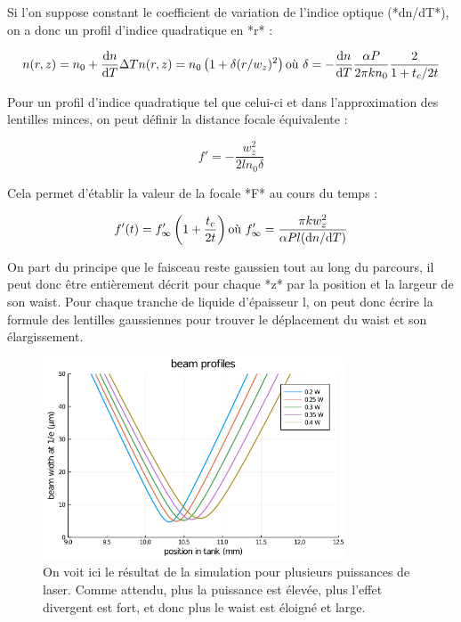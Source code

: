 Si l'on suppose constant le coefficient de variation de l'indice optique (*dn/dT*), on a donc un profil d'indice quadratique en *r* :

$$
n(r,z) = n_0 + \frac{\mathrm{d}n}{\mathrm{d}T}\Delta T
\\
n(r,z) = n_0 \left( 1+ \delta (r/w_z)^2 \right)
\\
\text{où} \ \delta = - \frac{\mathrm{d}n}{\mathrm{d}T} \frac{\alpha P}{2\pi kn_0} \frac{2}{1+t_c/2t}
$$

Pour un profil d'indice quadratique tel que celui-ci et dans l'approximation des lentilles minces, on peut définir la distance focale équivalente :

$$
f' = -\frac{w^2_z}{2ln_0\delta}
$$

Cela permet d'établir la valeur de la focale *F* au cours du temps :

$$
f'(t) = f'_\infty \left( 1 + \frac{t_c}{2t} \right)
\\
\text{où} \ f'_\infty = \frac{\pi k w_z^2}{\alpha Pl(\mathrm{d}n/\mathrm{d}T)}
$$

On part du principe que le faisceau reste gaussien tout au long du parcours, il peut donc être entièrement décrit pour chaque *z* par la position et la largeur de son waist. Pour chaque tranche de liquide d'épaisseur l, on peut donc écrire la formule des lentilles gaussiennes pour trouver le déplacement du waist et son élargissement.

\begin{figure}
\centering
\includegraphics[width=0.8\textwidth]{./files/grinlensplots_profile.png}
\caption{
On voit ici le résultat de la simulation pour plusieurs puissances de laser. Comme attendu, plus la puissance est élevée, plus l'effet divergent est fort, et donc plus le waist est éloigné et large.
}
\end{figure}

